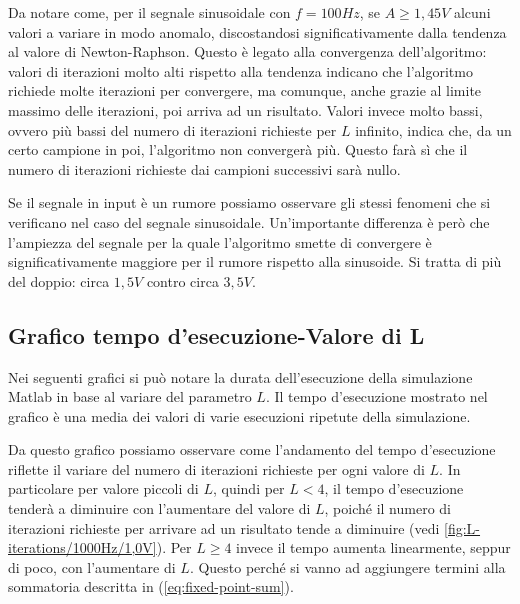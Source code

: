 			Da notare come, per il segnale sinusoidale con $f = 100Hz$, se $A \ge 1,45V$ alcuni valori a variare in modo anomalo, discostandosi significativamente dalla tendenza al valore di Newton-Raphson. Questo è legato alla convergenza dell'algoritmo: valori di iterazioni molto alti rispetto alla tendenza indicano che l'algoritmo richiede molte iterazioni per convergere, ma comunque, anche grazie al limite massimo delle iterazioni, poi arriva ad un risultato. Valori invece molto bassi, ovvero più bassi del numero di iterazioni richieste per $L$ infinito, indica che, da un certo campione in poi, l'algoritmo non convergerà più. Questo farà sì che il numero di iterazioni richieste dai campioni successivi sarà nullo.
			
			\graficospace
			\graficospace
			\graficospace
			
			Se il segnale in input è un rumore possiamo osservare gli stessi fenomeni che si verificano nel caso del segnale sinusoidale. Un'importante differenza è però che l'ampiezza del segnale per la quale l'algoritmo smette di convergere è significativamente maggiore per il rumore rispetto alla sinusoide. Si tratta di più del doppio: circa $1,5V$ contro circa $3,5V$.
			\pagebreak
			
		\subsection{Grafico tempo d'esecuzione-Valore di L}
			\label{subsec:tempo_esecuzione}
			Nei seguenti grafici si può notare la durata dell'esecuzione della simulazione Matlab in base al variare del parametro $L$. Il tempo d'esecuzione mostrato nel grafico è una media dei valori di varie esecuzioni ripetute della simulazione.
			
			\graficospace
			
			Da questo grafico possiamo osservare come l'andamento del tempo d'esecuzione riflette il variare del numero di iterazioni richieste per ogni valore di $L$. In particolare per valore piccoli di $L$, quindi per $L < 4$, il tempo d'esecuzione tenderà a diminuire con l'aumentare del valore di $L$, poiché il numero di iterazioni richieste per arrivare ad un risultato tende a diminuire (vedi \ref{fig:L-iterations/1000Hz/1,0V}). Per $L \ge 4$ invece il tempo aumenta linearmente, seppur di poco, con l'aumentare di $L$. Questo perché si vanno ad aggiungere termini alla sommatoria descritta in (\ref{eq:fixed-point-sum}).
			

